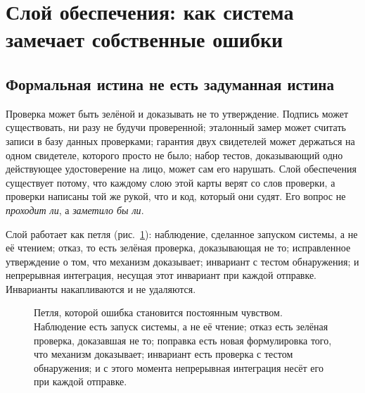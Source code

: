 \section{Слой обеспечения: как система замечает собственные ошибки}
\label{sec:senses}



\subsection{Формальная истина не есть задуманная истина}

Проверка может быть зелёной и доказывать не то утверждение. Подпись может существовать, ни разу не
будучи проверенной; эталонный замер может считать записи в базу данных проверками; гарантия двух
свидетелей может держаться на одном свидетеле, которого просто не было; набор тестов, доказывающий одно
действующее удостоверение на лицо, может сам его нарушать. Слой обеспечения существует потому, что
каждому слою этой карты верят со слов проверки, а проверки написаны той же рукой, что и код, который они
судят. Его вопрос не \emph{проходит ли}, а \emph{заметило бы ли}.

Слой работает как петля (рис.~\ref{fig:senses-loop}): наблюдение, сделанное запуском системы, а не её
чтением; отказ, то есть зелёная проверка, доказывающая не то; исправленное утверждение о том, что
механизм доказывает; инвариант с тестом обнаружения; и непрерывная интеграция, несущая этот инвариант при
каждой отправке. Инварианты накапливаются и не удаляются.

\begin{figure}[H]\centering
  \caption{Петля, которой ошибка становится постоянным чувством. Наблюдение есть запуск системы,
а не её чтение; отказ есть зелёная проверка, доказавшая не то; поправка есть новая формулировка
того, что механизм доказывает; инвариант есть проверка с тестом обнаружения; и с этого момента
непрерывная интеграция несёт его при каждой отправке.}\label{fig:senses-loop}\end{figure}

